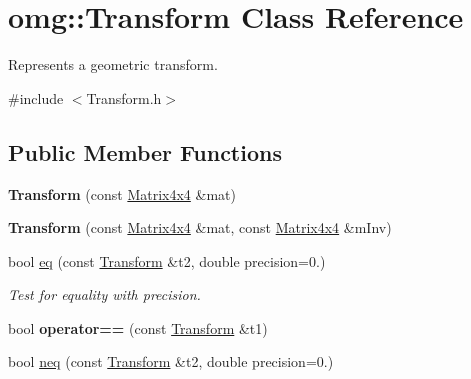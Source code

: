 \hypertarget{classomg_1_1_transform}{}\section{omg\+::Transform Class Reference}
\label{classomg_1_1_transform}


Represents a geometric transform.  




{\ttfamily \#include $<$Transform.\+h$>$}

\subsection*{Public Member Functions}
\begin{DoxyCompactItemize}
\item 
\mbox{\label{classomg_1_1_transform_a5f3df5dcc5bc6bec80e4cb96eb6d276e}} 
{\bfseries Transform} (const \mbox{\hyperlink{classtao_1_1_mat}{Matrix4x4}} \&mat)
\item 
\mbox{\label{classomg_1_1_transform_ad352c006b6a14aa94e5c5c3d201d6394}} 
{\bfseries Transform} (const \mbox{\hyperlink{classtao_1_1_mat}{Matrix4x4}} \&mat, const \mbox{\hyperlink{classtao_1_1_mat}{Matrix4x4}} \&m\+Inv)
\item 
\mbox{\label{classomg_1_1_transform_a043ba204cad00fcf48293409c29f076b}} 
bool \mbox{\hyperlink{classomg_1_1_transform_a043ba204cad00fcf48293409c29f076b}{eq}} (const \mbox{\hyperlink{classomg_1_1_transform}{Transform}} \&t2, double precision=0.)
\begin{DoxyCompactList}\small\item\em Test for equality with precision. \end{DoxyCompactList}\item 
\mbox{\label{classomg_1_1_transform_a2abe54a9d5d4d534472442a078272f85}} 
bool {\bfseries operator==} (const \mbox{\hyperlink{classomg_1_1_transform}{Transform}} \&t1)
\item 
\mbox{\label{classomg_1_1_transform_afdef3520d417d8ea15a2f1674a6e41a6}} 
bool \mbox{\hyperlink{classomg_1_1_transform_afdef3520d417d8ea15a2f1674a6e41a6}{neq}} (const \mbox{\hyperlink{classomg_1_1_transform}{Transform}} \&t2, double precision=0.)

\end{DoxyCompactItemize}
